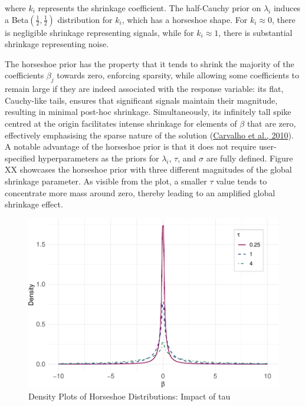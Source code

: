 \documentclass[
  11pt,
]{article}
\begin{document}
where \(k_i\) represents the shrinkage coefficient. The half-Cauchy
prior on \(\lambda_i\) induces a Beta\((\frac{1}{2}, \frac{1}{2})\)
distribution for \(k_i\), which has a horseshoe shape. For
\(k_i \approx 0\), there is negligible shrinkage representing signals,
while for \(k_i \approx 1\), there is substantial shrinkage representing
noise.

The horseshoe prior has the property that it tends to shrink the
majority of the coefficients \(\beta_j\) towards zero, enforcing
sparsity, while allowing some coefficients to remain large if they are
indeed associated with the response variable: its flat, Cauchy-like
tails, ensures that significant signals maintain their magnitude,
resulting in minimal post-hoc shrinkage. Simultaneously, its infinitely
tall spike centred at the origin facilitates intense shrinkage for
elements of \(\beta\) that are zero, effectively emphasising the sparse
nature of the solution (\protect\hyperlink{ref-Carvalho2010}{Carvalho et
al., 2010}). A notable advantage of the horseshoe prior is that it does
not require user-specified hyperparameters as the priors for
\(\lambda_i\), \(\tau\), and \(\sigma\) are fully defined. Figure XX
showcases the horseshoe prior with three different magnitudes of the
global shrinkage parameter. As visible from the plot, a smaller \(\tau\)
value tends to concentrate more mass around zero, thereby leading to an
amplified global shrinkage effect.

\begin{figure}

{\centering \includegraphics[width=0.75\linewidth]{dissertation_files/figure-latex/Horseshoe Priors-1} 

}

\caption{Density Plots of Horseshoe Distributions: Impact of tau}\label{fig:Horseshoe Priors}
\end{figure}
\end{document}
